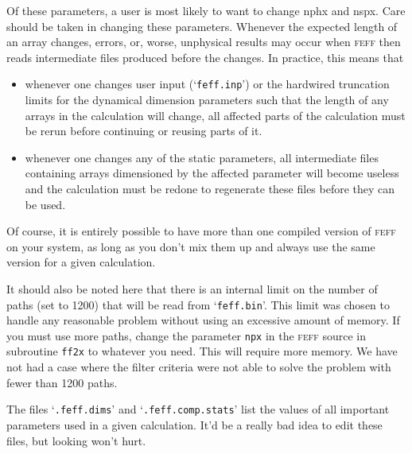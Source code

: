 \documentclass[11pt,oneside]{report} %
\newcommand{\program}[1]{\textsc{#1}}
\newcommand{\feff}{\program{feff}}
\newcommand{\file}[1]{`\texttt{#1}'}
\begin{document}
\begin{latexonly}
\begin{verbatim}
\end{verbatim}


Of these parameters, a user is most likely to want to change nphx and nspx.
Care should be taken in changing these parameters.  Whenever the expected length of an array changes,
errors, or, worse, unphysical results may occur when {\feff} then reads intermediate files produced
before the changes.  In practice, this means that
\begin{itemize}
\item whenever one changes user input (\file{feff.inp}) or the hardwired truncation limits for the dynamical
dimension parameters such that the length of any arrays in the calculation will change, all affected parts
of the calculation must be rerun before continuing or reusing parts of it.
\item whenever one changes any of the static parameters, all intermediate files containing arrays dimensioned by
the affected parameter will become useless and the calculation must be redone to regenerate these files before they can be used.
\end{itemize}

Of course, it is entirely possible to have more than one compiled version of {\feff} on your system, as long as you
don't mix them up and always use the same version for a given calculation.

It should also be noted here that there is an internal limit on the 
number of paths (set to 1200) that will be read from \file{feff.bin}. 
This limit was chosen to handle any reasonable problem without using 
an excessive amount of memory. If you must use more paths, change the 
parameter \texttt{npx} in the {\feff} source in subroutine \texttt{ff2x} 
to whatever you need. This will require more memory. We have not had 
a case where the filter criteria were not able to solve the problem 
with fewer than 1200 paths.

The files \file{.feff.dims} and \file{.feff.comp.stats} list the values of all important parameters used in a given
calculation.    It'd be a really bad idea to edit these files, but looking won't hurt.




\end{latexonly}
\end{document}
